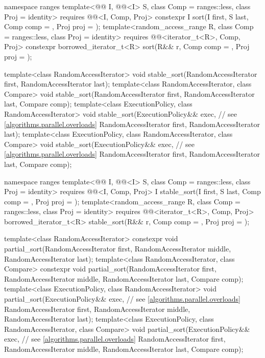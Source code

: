 \begin{codeblock}
{  namespace ranges {
    template<@@ I, @@<I> S, class Comp = ranges::less,
             class Proj = identity>
      requires @@<I, Comp, Proj>
      constexpr I
        sort(I first, S last, Comp comp = {}, Proj proj = {});
    template<random_access_range R, class Comp = ranges::less, class Proj = identity>
      requires @@<iterator_t<R>, Comp, Proj>
      constexpr borrowed_iterator_t<R>
        sort(R&& r, Comp comp = {}, Proj proj = {});
  }

  template<class RandomAccessIterator>
    void stable_sort(RandomAccessIterator first, RandomAccessIterator last);
  template<class RandomAccessIterator, class Compare>
    void stable_sort(RandomAccessIterator first, RandomAccessIterator last,
                     Compare comp);
  template<class ExecutionPolicy, class RandomAccessIterator>
    void stable_sort(ExecutionPolicy&& exec,                    // see \ref{algorithms.parallel.overloads}
                     RandomAccessIterator first, RandomAccessIterator last);
  template<class ExecutionPolicy, class RandomAccessIterator, class Compare>
    void stable_sort(ExecutionPolicy&& exec,                    // see \ref{algorithms.parallel.overloads}
                     RandomAccessIterator first, RandomAccessIterator last,
                     Compare comp);

  namespace ranges {
    template<@@ I, @@<I> S, class Comp = ranges::less,
             class Proj = identity>
      requires @@<I, Comp, Proj>
      I stable_sort(I first, S last, Comp comp = {}, Proj proj = {});
    template<random_access_range R, class Comp = ranges::less, class Proj = identity>
      requires @@<iterator_t<R>, Comp, Proj>
      borrowed_iterator_t<R>
        stable_sort(R&& r, Comp comp = {}, Proj proj = {});
  }

  template<class RandomAccessIterator>
    constexpr void partial_sort(RandomAccessIterator first,
                                RandomAccessIterator middle,
                                RandomAccessIterator last);
  template<class RandomAccessIterator, class Compare>
    constexpr void partial_sort(RandomAccessIterator first,
                                RandomAccessIterator middle,
                                RandomAccessIterator last, Compare comp);
  template<class ExecutionPolicy, class RandomAccessIterator>
    void partial_sort(ExecutionPolicy&& exec,                   // see \ref{algorithms.parallel.overloads}
                      RandomAccessIterator first,
                      RandomAccessIterator middle,
                      RandomAccessIterator last);
  template<class ExecutionPolicy, class RandomAccessIterator, class Compare>
    void partial_sort(ExecutionPolicy&& exec,                   // see \ref{algorithms.parallel.overloads}
                      RandomAccessIterator first,
                      RandomAccessIterator middle,
                      RandomAccessIterator last, Compare comp);

}
\end{codeblock}
